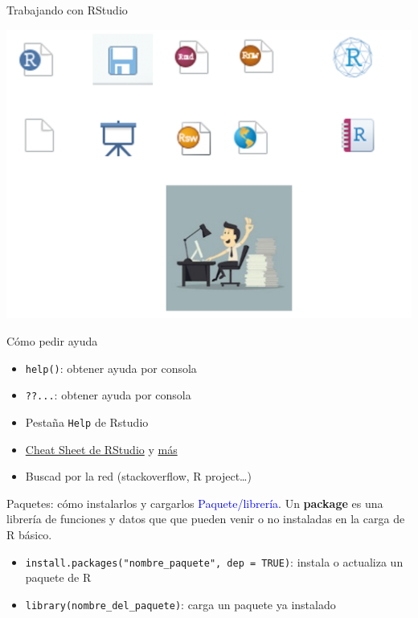 \documentclass[
  ignorenonframetext,
]{beamer}
\providecommand{\tightlist}{%
  \setlength{\itemsep}{0pt}\setlength{\parskip}{0pt}}
\newcommand\blue[1]{\textcolor{blue}{#1}}
\begin{document}
\begin{frame}{Trabajando con RStudio}
\label{trabajando-con-rstudio}
\begin{center}\includegraphics[width=0.7\linewidth]{Imgs/easy_plus_tools} \end{center}
\end{frame}

\begin{frame}[fragile]{Cómo pedir ayuda}
\label{cuxf3mo-pedir-ayuda}
\begin{itemize}
\tightlist
\item
  \texttt{help()}: obtener ayuda por consola
\item
  \texttt{??...}: obtener ayuda por consola
\item
  Pestaña \texttt{Help} de Rstudio
\item
  \href{https://www.rstudio.com/wp-content/uploads/2015/02/rmarkdown-cheatsheet.pdf}{Cheat
  Sheet de RStudio} y
  \href{https://www.google.com/search?q=Cheat+Sheet++RStudio&rlz=1C1CHBF_esES891ES891&sxsrf=ALiCzsYTamg5AX36RN8EhpV8lSO55ijfRw\%3A1664221782651&ei=VgIyY5GzJ5nCa6rfovAP&ved=0ahUKEwiRtrqhnbP6AhUZ4RoKHaqvCP4Q4dUDCA4&uact=5&oq=Cheat+Sheet++RStudio&gs_lcp=Cgdnd3Mtd2l6EAMyCAgAEB4QBxATMggIABAeEAUQEzIICAAQHhAFEBMyCAgAEB4QBRATMggIABAeEAUQEzIICAAQHhAFEBMyCAgAEB4QBRATMggIABAeEAgQEzIICAAQHhAIEBMyCAgAEB4QCBATOgoIABBHENYEELADOggIABAeEAgQB0oECEEYAEoECEYYAFCmCljnC2DOEWgBcAF4AIABaogBzQGSAQMxLjGYAQCgAQHIAQjAAQE&sclient=gws-wiz}{más}
\item
  Buscad por la red (stackoverflow, R project\ldots)
\end{itemize}
\end{frame}

\begin{frame}[fragile]{Paquetes: cómo instalarlos y cargarlos}
\label{paquetes-cuxf3mo-instalarlos-y-cargarlos}
\blue{Paquete/librería}. Un \textbf{package} es una librería de
funciones y datos que que pueden venir o no instaladas en la carga de R
básico.

\begin{itemize}
\tightlist
\item
  \texttt{install.packages("nombre\_paquete",\ dep\ =\ TRUE)}: instala o
  actualiza un paquete de R
\item
  \texttt{library(nombre\_del\_paquete)}: carga un paquete ya instalado
\end{itemize}
\end{frame}
\end{document}
